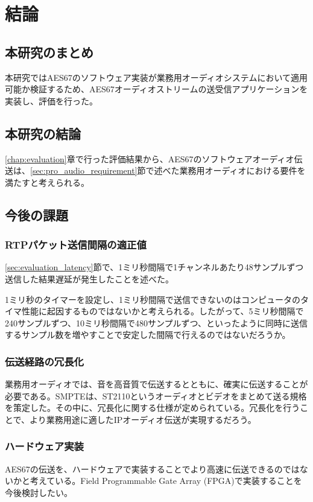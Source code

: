\chapter{結論}
\label{chap:conclusion}

\section{本研究のまとめ}
\label{section:conclusion}

本研究ではAES67のソフトウェア実装が業務用オーディオシステムにおいて適用可能か検証するため、AES67オーディオストリームの送受信アプリケーションを実装し、評価を行った。

\section{本研究の結論}

\ref{chap:evaluation}章で行った評価結果から、AES67のソフトウェアオーディオ伝送は、\ref{sec:pro_audio_requirement}節で述べた業務用オーディオにおける要件を満たすと考えられる。

\section{今後の課題}

\subsection{RTPパケット送信間隔の適正値}

\ref{sec:evaluation_latency}節で、1ミリ秒間隔で1チャンネルあたり48サンプルずつ送信した結果遅延が発生したことを述べた。

1ミリ秒のタイマーを設定し、1ミリ秒間隔で送信できないのはコンピュータのタイマ性能に起因するものではないかと考えられる。したがって、5ミリ秒間隔で240サンプルずつ、10ミリ秒間隔で480サンプルずつ、といったように同時に送信するサンプル数を増やすことで安定した間隔で行えるのではないだろうか。

\subsection{伝送経路の冗長化}

業務用オーディオでは、音を高音質で伝送するとともに、確実に伝送することが必要である。SMPTEは、ST2110\cite{smpte-st2110}というオーディオとビデオをまとめて送る規格を策定した。その中に、冗長化に関する仕様が定められている。冗長化を行うことで、より業務用途に適したIPオーディオ伝送が実現するだろう。

\subsection{ハードウェア実装}

AES67の伝送を、ハードウェアで実装することでより高速に伝送できるのではないかと考えている。Field Programmable Gate Array (FPGA)で実装することを今後検討したい。

